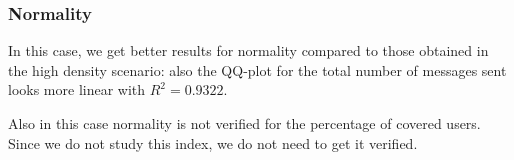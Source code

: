 \subsubsection{Normality}\label{subsubsec:ldassumptionsnormality}

In this case, we get better results for normality compared to those obtained in
the high density scenario: also the QQ-plot for the total number of messages
sent looks more linear with \(R^2\!=\!0.9322\).

Also in this case normality is not verified for the percentage of covered users.
Since we do not study this index, we do not need to get it verified.
